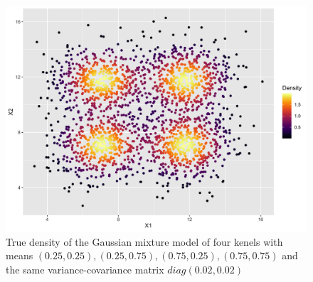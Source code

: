 \documentclass[11pt,a4paper,]{article}
\begin{document}
\begin{figure}

{\centering \includegraphics[width=0.8\linewidth]{figures/truedensity_4kernels} 

}

\caption{True density of the Gaussian mixture model of four kenels with means $(0.25, 0.25), (0.25, 0.75), (0.75, 0.25), (0.75, 0.75)$ and the same variance-covariance matrix $diag(0.02, 0.02)$}\label{fig:metadensity}
\end{figure}
\end{document}
